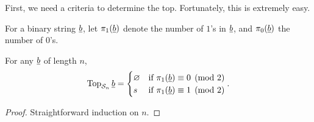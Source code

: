 First, we need a criteria to determine the top.  Fortunately, this is extremely easy.
\begin{definition*}
	For a binary string $\underline{b}$, let $\pi_1(\underline{b})$ denote the number of $1$'s in $\underline{b}$, and $\pi_0(\underline{b})$ the number of $0$'s.
\end{definition*}
\begin{proposition}
	For any $\underline{b}$ of length $n$, \[
		\operatorname{Top}_{\mathcal S_n} \underline{b} =
		\begin{cases}
			\varnothing & \text{if } \pi_1(\underline{b}) \equiv 0 \pmod{2} \\
			s & \text{if } \pi_1(\underline{b}) \equiv 1 \pmod{2} \\
		\end{cases}.
		\]
\end{proposition}
\begin{proof}
	Straightforward induction on $n$.  
\end{proof}

